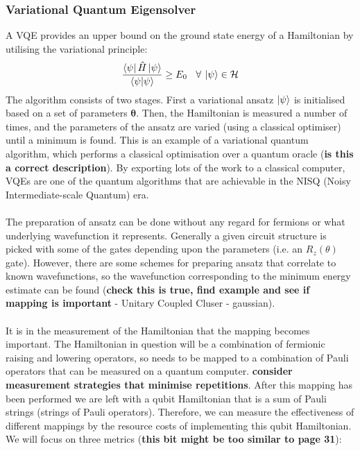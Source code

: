 \documentclass[twoside]{article}
\begin{document}
\subsubsection{Variational Quantum Eigensolver}
A VQE provides an upper bound on the ground state energy of a Hamiltonian by utilising the variational principle:
\begin{equation}
        \frac{\bra{\psi} \hat H \ket{\psi}}{\braket{\psi | \psi}} \geq E_0 \>\>\>\> \forall \> \ket{\psi}\in \mathcal{H}
\end{equation}
The algorithm consists of two stages. First a variational ansatz $\ket{\psi}$ is initialised based on a set of parameters $\bm \theta$. Then, the Hamiltonian is measured a number of times, and the parameters of the ansatz are varied (using a classical optimiser) until a minimum is found. This is an example of a variational quantum algorithm, which performs a classical optimisation over a quantum oracle (\textbf{is this a correct description}). By exporting lots of the work to a classical computer, VQEs are one of the quantum algorithms that are achievable in the NISQ (Noisy Intermediate-scale Quantum) era.\\\\ 
The preparation of ansatz can be done without any regard for fermions or what underlying wavefunction it represents. Generally a given circuit structure is picked with some of the gates depending upon the parameters (i.e. an $R_z(\theta)$ gate). However, there are some schemes for preparing ansatz that correlate to known wavefunctions, so the wavefunction corresponding to the minimum energy estimate can be found (\textbf{check this is true, find example and see if mapping is important} - Unitary Coupled Cluser - gaussian).\\\\
It is in the measurement of the Hamiltonian that the mapping becomes important. The Hamiltonian in question will be a combination of fermionic raising and lowering operators, so needs to be mapped to a combination of Pauli operators that can be measured on a quantum computer. \textbf{consider measurement strategies that minimise repetitions}. After this mapping has been performed we are left with a qubit Hamiltonian that is a sum of Pauli strings (strings of Pauli operators). Therefore, we can measure the effectiveness of different mappings by the resource costs of implementing this qubit Hamiltonian. We will focus on three metrics (\textbf{this bit might be too similar to \cite{vqe} page 31\cite{vqe}}):
\end{document}
